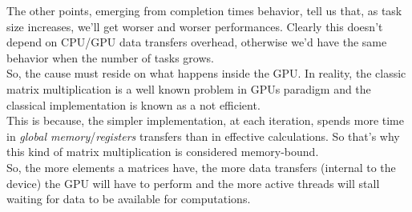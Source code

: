 The other points, emerging from completion times behavior, tell us that, as task size increases, we'll get worser and worser performances. Clearly this doesn't depend on CPU/GPU data transfers overhead, otherwise we'd have the same behavior when the number of tasks grows.\\
So, the cause must reside on what happens inside the GPU. In reality, the classic matrix multiplication is a well known problem in GPUs paradigm and the classical implementation is known as a not efficient. \\
This is because, the simpler implementation, at each iteration, spends more time in \textit{global memory}/\textit{registers} transfers than in effective calculations. So that's why this kind of matrix multiplication is considered memory-bound.\\
So, the more elements a matrices have, the more data transfers (internal to the device) the GPU will have to perform and the more active threads will stall waiting for data to be available for computations.\\

